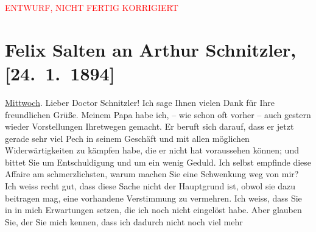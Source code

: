 
\begin{center}
            \textcolor{red}{ENTWURF, NICHT FERTIG KORRIGIERT}
                      \end{center}
            
         
         \renewcommand{\erwaehntePersonen}{Personen: Philipp Salzmann}
         \renewcommand{\erwaehnteOrte}{Orte: Wien}
         \renewcommand{\erwaehnteWerke}{}
               \section[Felix Salten an Arthur Schnitzler, {[}24. 1. 1894{]}]{ Felix Salten an Arthur Schnitzler, {[}24. 1. 1894{]}}\nopagebreak{}\rehead{ }\begin{ledgroupsized}[t]{13cm}\normalsize\beginnumbering \toendnotes[C]{\smallbreak\pagebreak[2]} 
\toendnotes[C]{\smallbreak}\pstart
           {\pb}\uline{Mittwoch}.\pend
           \pstart
           Lieber Doctor Schnitzler! Ich sage Ihnen vielen Dank für Ihre
               freundlichen Grüße. Meinem Papa habe ich, – wie schon oft vorher – auch gestern wieder Vorstellungen
               Ihretwegen gemacht. Er beruft sich darauf, dass er jetzt gerade sehr viel Pech in
               seinem Geschäft und mit allen möglichen Widerwärtigkeiten zu kämpfen habe, die er
               nicht hat voraussehen können; und bittet Sie um Entschuldigung und um ein wenig
               Geduld. Ich selbst {\pb}empfinde diese Affaire am schmerzlichsten, warum machen Sie eine Schwenkung weg von
               mir? Ich weiss recht gut, dass diese Sache nicht der Hauptgrund ist, obwol sie dazu
               beitragen mag, eine vorhandene Verstimmung zu vermehren. Ich weiss, dass Sie in
               \label{K_L03132-1v}\label{K_L03132-1h} in mich Erwartungen setzen, die ich noch nicht eingelöst
               habe. Aber glauben Sie, der Sie mich kennen, dass ich dadurch nicht noch viel mehr

\end{ledgroupsized}
